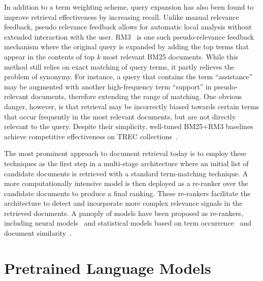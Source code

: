 In addition to a term weighting scheme, query expansion has also been found to improve retrieval effectiveness by increasing recall.
Unlike manual relevance feedback, pseudo relevance feedback allows for automatic local analysis without extended interaction with the user.
RM3~\cite{lavrenko2017relevance} is one such pseudo-relevance feedback mechanism where the original query is expanded by adding the top terms that appear in the contents of top $ k $ most relevant BM25 documents.
While this method still relies on exact matching of query terms, it partly relieves the problem of synonymy.
For instance, a query that contains the term ``assistance'' may be augmented with another high-frequency term ``support'' in pseudo-relevant documents, therefore extending the range of matching.
One obvious danger, however, is that retrieval may be incorrectly biased towards certain terms that occur frequently in the most relevant documents, but are not directly relevant to the query.
Despite their simplicity, well-tuned BM25+RM3 baselines achieve competitive effectiveness on TREC collections~\cite{lin2019neural}.


The most prominent approach to document retrieval today is to employ these techniques as the first step in a multi-stage architecture where an initial list of candidate documents is retrieved with a standard term-matching technique.
A more computationally intensive model is then deployed as a re-ranker over the candidate documents to produce a final ranking.
These re-rankers facilitate the architecture to detect and incorporate more complex relevance signals in the retrieved documents.
A panoply of models have been proposed as re-rankers, including neural models~\cite{dehghani2017neural} and statistical models based on term occurrence~\cite{lingpeng2004document} and document similarity~\cite{lee2001re, balinski2005re}.

\section{Pretrained Language Models}
\label{lm}

